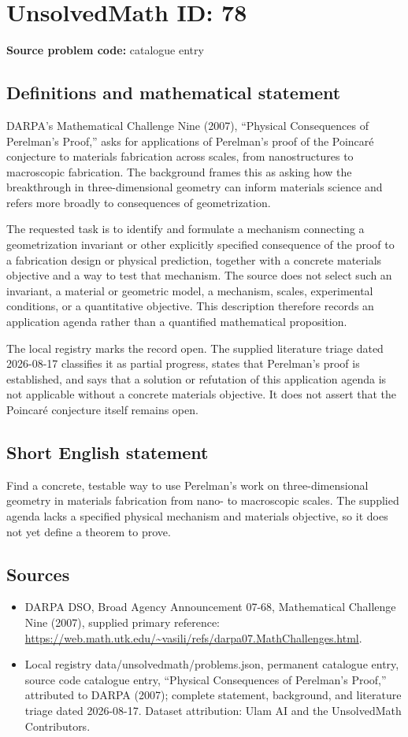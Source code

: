 \documentclass[11pt]{article}
\begin{document}
\section*{UnsolvedMath ID: 78}
\textbf{Source problem code:} catalogue entry
\subsection{Definitions and mathematical statement}
DARPA's Mathematical Challenge Nine (2007), ``Physical Consequences of Perelman's Proof,'' asks for applications of Perelman's proof of the Poincar\'e conjecture to materials fabrication across scales, from nanostructures to macroscopic fabrication. The background frames this as asking how the breakthrough in three-dimensional geometry can inform materials science and refers more broadly to consequences of geometrization.

The requested task is to identify and formulate a mechanism connecting a geometrization invariant or other explicitly specified consequence of the proof to a fabrication design or physical prediction, together with a concrete materials objective and a way to test that mechanism. The source does not select such an invariant, a material or geometric model, a mechanism, scales, experimental conditions, or a quantitative objective. This description therefore records an application agenda rather than a quantified mathematical proposition.

The local registry marks the record open. The supplied literature triage dated 2026-08-17 classifies it as partial progress, states that Perelman's proof is established, and says that a solution or refutation of this application agenda is not applicable without a concrete materials objective. It does not assert that the Poincar\'e conjecture itself remains open.
\subsection{Short English statement}
Find a concrete, testable way to use Perelman's work on three-dimensional geometry in materials fabrication from nano- to macroscopic scales. The supplied agenda lacks a specified physical mechanism and materials objective, so it does not yet define a theorem to prove.
\subsection{Sources}
\begin{itemize}
\item DARPA DSO, Broad Agency Announcement 07-68, Mathematical Challenge Nine (2007), supplied primary reference: \url{https://web.math.utk.edu/~vasili/refs/darpa07.MathChallenges.html}.
\item Local registry data/unsolvedmath/problems.json, permanent catalogue entry, source code catalogue entry, ``Physical Consequences of Perelman's Proof,'' attributed to DARPA (2007); complete statement, background, and literature triage dated 2026-08-17. Dataset attribution: Ulam AI and the UnsolvedMath Contributors.
\end{itemize}
\end{document}
